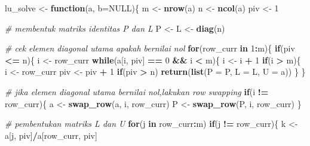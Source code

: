 \documentclass[
]{book}
\newenvironment{Shaded}{\begin{snugshade}}{\end{snugshade}}
\newcommand{\AttributeTok}[1]{\textcolor[rgb]{0.13,0.29,0.53}{#1}}
\newcommand{\CommentTok}[1]{\textcolor[rgb]{0.56,0.35,0.01}{\textit{#1}}}
\newcommand{\ConstantTok}[1]{\textcolor[rgb]{0.56,0.35,0.01}{#1}}
\newcommand{\ControlFlowTok}[1]{\textcolor[rgb]{0.13,0.29,0.53}{\textbf{#1}}}
\newcommand{\DecValTok}[1]{\textcolor[rgb]{0.00,0.00,0.81}{#1}}
\newcommand{\FunctionTok}[1]{\textcolor[rgb]{0.13,0.29,0.53}{\textbf{#1}}}
\newcommand{\NormalTok}[1]{#1}
\newcommand{\OtherTok}[1]{\textcolor[rgb]{0.56,0.35,0.01}{#1}}
\newcommand{\SpecialCharTok}[1]{\textcolor[rgb]{0.81,0.36,0.00}{\textbf{#1}}}
\theoremstyle{definition}
\theoremstyle{definition}
\theoremstyle{definition}
\theoremstyle{definition}
\theoremstyle{remark}
\begin{document}
\begin{Shaded}
\begin{Highlighting}[]
\NormalTok{lu\_solve }\OtherTok{\textless{}{-}} \ControlFlowTok{function}\NormalTok{(a, }\AttributeTok{b=}\ConstantTok{NULL}\NormalTok{)\{}
\NormalTok{    m }\OtherTok{\textless{}{-}} \FunctionTok{nrow}\NormalTok{(a)}
\NormalTok{    n }\OtherTok{\textless{}{-}} \FunctionTok{ncol}\NormalTok{(a)}
\NormalTok{    piv }\OtherTok{\textless{}{-}} \DecValTok{1}

\CommentTok{\# membentuk matriks identitas P dan L}
\NormalTok{    P }\OtherTok{\textless{}{-}}\NormalTok{ L }\OtherTok{\textless{}{-}} \FunctionTok{diag}\NormalTok{(n)}

\CommentTok{\# cek elemen diagonal utama apakah bernilai nol}
    \ControlFlowTok{for}\NormalTok{(row\_curr }\ControlFlowTok{in} \DecValTok{1}\SpecialCharTok{:}\NormalTok{m)\{}
        \ControlFlowTok{if}\NormalTok{(piv }\SpecialCharTok{\textless{}=}\NormalTok{ n)\{}
\NormalTok{            i }\OtherTok{\textless{}{-}}\NormalTok{ row\_curr}
            \ControlFlowTok{while}\NormalTok{(a[i, piv] }\SpecialCharTok{==} \DecValTok{0} \SpecialCharTok{\&\&}\NormalTok{ i }\SpecialCharTok{\textless{}}\NormalTok{ m)\{}
\NormalTok{                i }\OtherTok{\textless{}{-}}\NormalTok{ i }\SpecialCharTok{+} \DecValTok{1}
                \ControlFlowTok{if}\NormalTok{(i }\SpecialCharTok{\textgreater{}}\NormalTok{ m)\{}
\NormalTok{                    i }\OtherTok{\textless{}{-}}\NormalTok{ row\_curr}
\NormalTok{                    piv }\OtherTok{\textless{}{-}}\NormalTok{ piv }\SpecialCharTok{+} \DecValTok{1}
                    \ControlFlowTok{if}\NormalTok{(piv }\SpecialCharTok{\textgreater{}}\NormalTok{ n)}
                        \FunctionTok{return}\NormalTok{(}\FunctionTok{list}\NormalTok{(}\AttributeTok{P =}\NormalTok{ P, }\AttributeTok{L =}\NormalTok{ L, }\AttributeTok{U =}\NormalTok{ a))}
\NormalTok{                \}}
\NormalTok{            \}}
            
\CommentTok{\# jika elemen diagonal utama bernilai nol,lakukan row swapping}
            \ControlFlowTok{if}\NormalTok{(i }\SpecialCharTok{!=}\NormalTok{ row\_curr)\{}
\NormalTok{                a }\OtherTok{\textless{}{-}} \FunctionTok{swap\_row}\NormalTok{(a, i, row\_curr)}
\NormalTok{                P }\OtherTok{\textless{}{-}} \FunctionTok{swap\_row}\NormalTok{(P, i, row\_curr)}
\NormalTok{            \}}
            
  \CommentTok{\# pembentukan matriks L dan U}
            \ControlFlowTok{for}\NormalTok{(j }\ControlFlowTok{in}\NormalTok{ row\_curr}\SpecialCharTok{:}\NormalTok{m)}
                \ControlFlowTok{if}\NormalTok{(j }\SpecialCharTok{!=}\NormalTok{ row\_curr)\{}
\NormalTok{                    k }\OtherTok{\textless{}{-}}\NormalTok{ a[j, piv]}\SpecialCharTok{/}\NormalTok{a[row\_curr, piv]}
                    

\end{Highlighting}
\end{Shaded}
\end{document}
